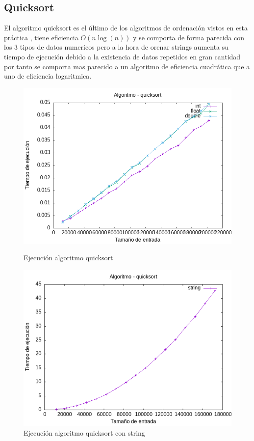 \documentclass[11pt]{article}
\begin{document}
\subsection*{Quicksort}
El algoritmo quicksort es el último de los algoritmos de ordenación vistos en esta práctica , tiene eficiencia $O(n\log(n))$ y se comporta de 
forma parecida con los 3 tipos de datos numericos pero  a la hora de orenar strings aumenta su tiempo de ejecución debido a la existencia de datos repetidos 
en gran cantidad por tanto se comporta mas parecido a un algoritmo de eficiencia cuadrática que a uno de eficiencia logaritmica.
\begin{figure}[H]
    \begin{minipage}{0.5\textwidth}
        \centering
        \includegraphics[width=\linewidth]{assets/Img/quicksort.png}
        \caption{Ejecución algoritmo quicksort}
        \label{fig:quicksort}
    \end{minipage}%
    \begin{minipage}{0.5\textwidth}
        \centering
        \includegraphics[width=\linewidth]{assets/Img/quicksortstring.png}
        \caption{Ejecución algoritmo quicksort con string}
        \label{fig:quicksortstring}
    \end{minipage}
\end{figure}
\end{document}

